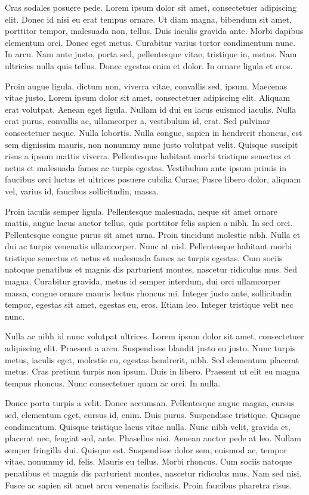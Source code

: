 Cras sodales posuere pede. Lorem ipsum dolor sit amet, consectetuer adipiscing elit. Donec id nisi eu erat tempus ornare. Ut diam magna, bibendum sit amet, porttitor tempor, malesuada non, tellus. Duis iaculis gravida ante. Morbi dapibus elementum orci. Donec eget metus. Curabitur varius tortor condimentum nunc. In arcu. Nam ante justo, porta sed, pellentesque vitae, tristique in, metus. Nam ultricies nulla quis tellus. Donec egestas enim et dolor. In ornare ligula et eros.

Proin augue ligula, dictum non, viverra vitae, convallis sed, ipsum. Maecenas vitae justo. Lorem ipsum dolor sit amet, consectetuer adipiscing elit. Aliquam erat volutpat. Aenean eget ligula. Nullam id dui eu lacus euismod iaculis. Nulla erat purus, convallis ac, ullamcorper a, vestibulum id, erat. Sed pulvinar consectetuer neque. Nulla lobortis. Nulla congue, sapien in hendrerit rhoncus, est sem dignissim mauris, non nonummy nunc justo volutpat velit. Quisque suscipit risus a ipsum mattis viverra. Pellentesque habitant morbi tristique senectus et netus et malesuada fames ac turpis egestas. Vestibulum ante ipsum primis in faucibus orci luctus et ultrices posuere cubilia Curae; Fusce libero dolor, aliquam vel, varius id, faucibus sollicitudin, massa.

Proin iaculis semper ligula. Pellentesque malesuada, neque sit amet ornare mattis, augue lacus auctor tellus, quis porttitor felis sapien a nibh. In sed orci. Pellentesque congue purus sit amet urna. Proin tincidunt molestie nibh. Nulla et dui ac turpis venenatis ullamcorper. Nunc at nisl. Pellentesque habitant morbi tristique senectus et netus et malesuada fames ac turpis egestas. Cum sociis natoque penatibus et magnis dis parturient montes, nascetur ridiculus mus. Sed magna. Curabitur gravida, metus id semper interdum, dui orci ullamcorper massa, congue ornare mauris lectus rhoncus mi. Integer justo ante, sollicitudin tempor, egestas sit amet, egestas eu, eros. Etiam leo. Integer tristique velit nec nunc.

Nulla ac nibh id nunc volutpat ultrices. Lorem ipsum dolor sit amet, consectetuer adipiscing elit. Praesent a arcu. Suspendisse blandit justo eu justo. Nunc turpis metus, iaculis eget, molestie eu, egestas hendrerit, nibh. Sed elementum placerat metus. Cras pretium turpis non ipsum. Duis in libero. Praesent ut elit eu magna tempus rhoncus. Nunc consectetuer quam ac orci. In nulla.

Donec porta turpis a velit. Donec accumsan. Pellentesque augue magna, cursus sed, elementum eget, cursus id, enim. Duis purus. Suspendisse tristique. Quisque condimentum. Quisque tristique lacus vitae nulla. Nunc nibh velit, gravida et, placerat nec, feugiat sed, ante. Phasellus nisi. Aenean auctor pede at leo. Nullam semper fringilla dui. Quisque est. Suspendisse dolor sem, euismod ac, tempor vitae, nonummy id, felis. Mauris eu tellus. Morbi rhoncus. Cum sociis natoque penatibus et magnis dis parturient montes, nascetur ridiculus mus. Nam sed nisi. Fusce ac sapien sit amet arcu venenatis facilisis. Proin faucibus pharetra risus.

